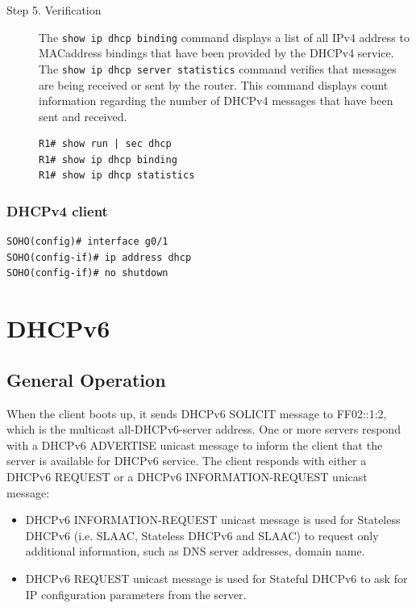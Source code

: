 \begin{description}
\item[Step 5. Verification] The \verb|show ip dhcp binding| command displays a list of all IPv4 address to MACaddress bindings that have been provided by the DHCPv4 service. The \verb|show ip dhcp server statistics| command verifies that messages are being received or sent by the router. This command displays count information regarding the number of DHCPv4 messages that have been sent and received.

\begin{verbatim}
R1# show run | sec dhcp
R1# show ip dhcp binding
R1# show ip dhcp statistics
\end{verbatim}
\end{description}

\subsection{DHCPv4 client}

\begin{verbatim}
SOHO(config)# interface g0/1
SOHO(config-if)# ip address dhcp
SOHO(config-if)# no shutdown
\end{verbatim}


\chapter{DHCPv6}

\section{General Operation}

When the client boots up, it sends DHCPv6 SOLICIT message to FF02::1:2, which is the multicast all-DHCPv6-server address. One or more servers respond with a DHCPv6 ADVERTISE unicast message to inform the client that the server is available for DHCPv6 service. The client responds with either a DHCPv6 REQUEST or a DHCPv6 INFORMATION-REQUEST unicast message: 

\begin{itemize}
\item DHCPv6 INFORMATION-REQUEST unicast message is used for Stateless DHCPv6 (i.e. SLAAC, Stateless DHCPv6 and SLAAC) to request only additional information, such as DNS server addresses, domain name.
\item DHCPv6 REQUEST unicast message is used for Stateful DHCPv6 to ask for IP configuration parameters from the server.
\end{itemize}

